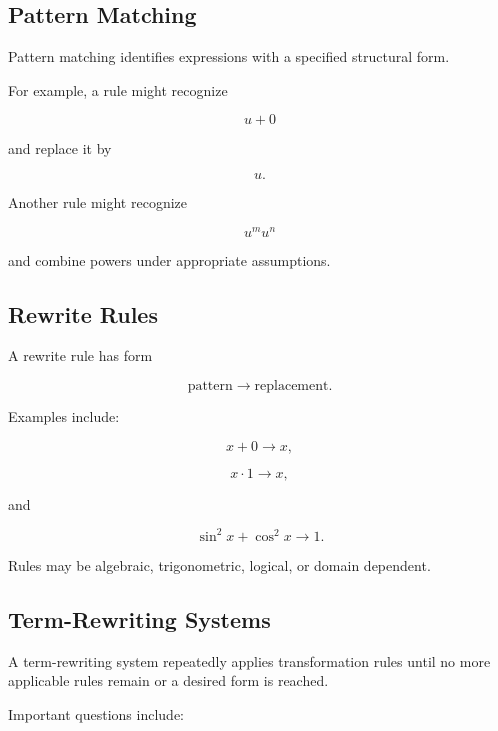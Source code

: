 \subsection{Pattern Matching}
\label{subsec:symbolic-pattern-matching}

Pattern matching identifies expressions with a specified structural form.

For example, a rule might recognize

\[
\boxed{
u+0
}
\]

and replace it by

\[
\boxed{
u.
}
\]

Another rule might recognize

\[
\boxed{
u^m u^n
}
\]

and combine powers under appropriate assumptions.

\subsection{Rewrite Rules}
\label{subsec:symbolic-rewrite-rules}

A rewrite rule has form

\[
\boxed{
\text{pattern}
\longrightarrow
\text{replacement}.
}
\]

Examples include:

\[
x+0
\longrightarrow
x,
\]

\[
x\cdot1
\longrightarrow
x,
\]

and

\[
\boxed{
\sin^2x+\cos^2x
\longrightarrow
1.
}
\]

Rules may be algebraic, trigonometric, logical, or domain dependent.

\subsection{Term-Rewriting Systems}
\label{subsec:term-rewriting-systems}

A term-rewriting system repeatedly applies transformation rules until no
more applicable rules remain or a desired form is reached.

Important questions include:

